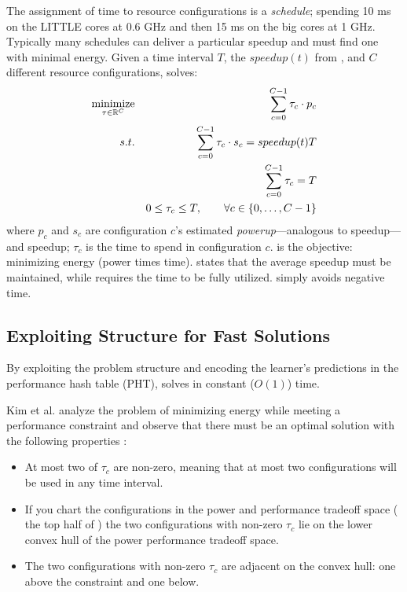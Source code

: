 The assignment of time to resource configurations is a
\emph{schedule}; \eg{} spending 10 ms on the LITTLE cores at 0.6 GHz
and then 15 ms on the big cores at 1 GHz. Typically many schedules can
deliver a particular speedup and \SYSTEM{} must find one with minimal
energy.  Given a time interval $T$, the $speedup(t)$ from
, and $C$ different resource configurations,
\SYSTEM{} solves:
\begin{eqnarray}
  \minimize_{\mathbf{\tau} \in \R^{C}} && \sum_{c=0}^{C-1} \tau_c \cdot p_c \label{eqn:power}  \\
  \st %
  && \sum_{c=0}^{C-1} \tau_c \cdot s_c =  speedup(t)T \label{eqn:work} \\
  && \sum_{c=0}^{C-1} \tau_c =  T \label{eqn:deadline} \\
  && 0 \le \tau_c \le T, \qquad \forall c \in \{0,\ldots,C-1\} \label{eqn:time}
\end{eqnarray}
where $p_c$ and $s_c$ are configuration $c$'s estimated
\emph{powerup}---analogous to speedup---and speedup; $\tau_c$ is the
time to spend in configuration $c$.   is the objective:
minimizing energy (power times time).   states that the
average speedup must be maintained, while  requires
the time to be fully utilized.   simply avoids negative
time.

\subsection{Exploiting Structure for Fast Solutions}
By exploiting the problem structure and encoding the learner's
predictions in the performance hash table (PHT), \SYSTEM{} solves
 in constant ($O(1)$) time.

Kim et al. analyze the problem of minimizing energy while meeting a
performance constraint and observe that there must be an optimal
solution with the following properties \cite{kim-cpsna}:
\begin{itemize}[leftmargin=1em]
\item At most two of $\tau_c$ are non-zero, meaning that at most two
  configurations will be used in any time interval.
\item If you chart the configurations in the power and performance
  tradeoff space (\eg{} the top half of ) the two
  configurations with non-zero $\tau_c$ lie on the lower convex hull
  of the power performance tradeoff space.
\item The two configurations with non-zero $\tau_c$ are adjacent on
  the convex hull: one above the constraint and one below.
\end{itemize}

